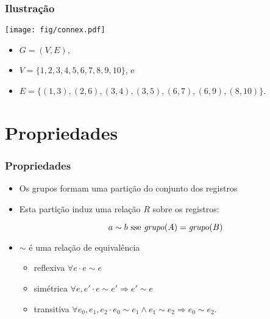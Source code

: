 \documentclass{beamer}
\begin{document}
\begin{frame}

  \frametitle{Ilustração}

\begin{center}
\texttt{[image: fig/connex.pdf]}
\end{center}

\begin{itemize}

\item $G = (V, E)$, 
\item $V = \{1,2,3,4,5,6,7,8,9,10\}$, e 
\item $E = \{(1,3),(2,6),(3,4),(3,5),(6,7),(6,9),(8,10)\}$.
\end{itemize}

\end{frame}

\section{Propriedades}

\begin{frame}
\frametitle{Propriedades}

\begin{itemize}

  \item Os grupos formam uma \alert{partição} do conjunto dos registros

  \item Esta partição induz uma relação $R$ sobre os registros:

    $$a \sim b \text{ sse } \id{grupo}(A) = \id{grupo}(B)$$

  \item $\sim$ é uma relação de equivalência

    \begin{itemize}

      \item reflexiva $\forall e \cdot e \sim e$

      \item simétrica $\forall e, e' \cdot e \sim e' \Rightarrow e' \sim e$

      \item transitiva $\forall e_0, e_1, e_2 \cdot e_0 \sim e_1 \land e_1 \sim e_2 \Rightarrow e_0 \sim e_2$.

    \end{itemize}

\end{itemize}

\end{frame}
\end{document}
